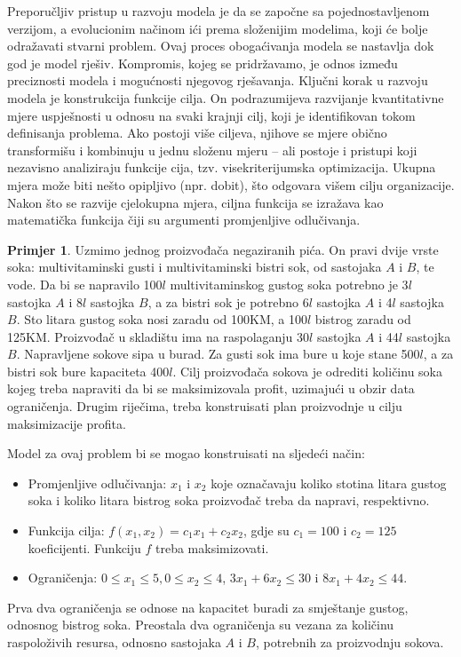 \documentclass[b5paper, utf8, 11pt, colorlinks]{book}
\theoremstyle{definition}
\newtheorem{primjer}{Primjer}[chapter]
\begin{document}
  Preporučljiv pristup u razvoju modela je da se započne sa pojednostavljenom verzijom, a  evolucionim načinom ići prema složenijim modelima, koji će bolje odražavati  stvarni problem. Ovaj proces obogaćivanja modela se nastavlja dok god je model rješiv. Kompromis, kojeg se pridržavamo, je odnos između preciznosti modela i mogućnosti njegovog rješavanja. Ključni korak u razvoju modela je konstrukcija funkcije cilja.
 On podrazumijeva razvijanje kvantitativne mjere uspješnosti u odnosu na svaki krajnji cilj, koji je identifikovan tokom definisanja problema.
 Ako postoji više ciljeva, njihove se mjere obično transformišu
i kombinuju u jednu složenu mjeru -- ali postoje i pristupi koji nezavisno analiziraju funkcije cija, tzv. visekriterijumska optimizacija.    Ukupna mjera može biti nešto opipljivo (npr. dobit), što odgovara višem cilju
 organizacije.  Nakon što se razvije cjelokupna mjera,  ciljna funkcija se izražava kao matematička funkcija čiji su argumenti promjenljive odlučivanja. 

 \begin{primjer}
 Uzmimo jednog proizvođača negaziranih pića. On pravi dvije vrste soka: multivitaminski gusti i multivitaminski bistri sok, od sastojaka $A$ i $B$, te vode. Da bi se napravilo 100$l$ multivitaminskog gustog soka potrebno je 3$l$
 sastojka $A$ i 8$l$ sastojka $B$, a za bistri sok je potrebno 6$l$ sastojka $A$ i 4$l$ sastojka $B$. Sto litara gustog soka nosi zaradu od 100KM, a 100$l$ bistrog zaradu od 125KM. Proizvođač u skladištu
 ima na raspolaganju 30$l$ sastojka $A$ i 44$l$ sastojka $B.$ Napravljene sokove sipa u burad. Za
 gusti sok ima bure u koje stane 500$l$, a za bistri sok bure kapaciteta 400$l$.  Cilj proizvođača sokova je odrediti količinu soka kojeg treba napraviti da bi se  maksimizovala profit,  uzimajući u obzir data ograničenja. Drugim
 riječima, treba konstruisati plan proizvodnje u cilju maksimizacije profita.
	
 \end{primjer}
 Model za ovaj problem bi se mogao konstruisati na sljedeći način:
 \begin{itemize}
     \item 
Promjenljive odlučivanja: $x_1$ i $x_2$ koje označavaju koliko stotina litara gustog soka i koliko litara bistrog soka proizvođač treba da napravi, respektivno.  
\item Funkcija cilja: $f(x_1, x_2) = c_1x_1 + c_2 x_2$, gdje su $c_1 = 100$ i  $c_2 = 125$ koeficijenti. Funkciju $f$ treba maksimizovati. 
\item Ograničenja: $0 \leq x_1 \leq 5, 0 \leq x_2 \leq 4$,   $3 x_1 + 6 x_2 \leq 30$ i $8 x_1 + 4 x_2 \leq 44.$
\end{itemize}
Prva dva ograničenja se odnose na kapacitet buradi za smještanje gustog, odnosnog bistrog soka. Preostala dva ograničenja su vezana za količinu raspoloživih resursa, odnosno sastojaka $A$ i $B$, potrebnih za proizvodnju sokova.
\end{document}
